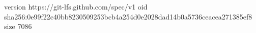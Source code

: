 version https://git-lfs.github.com/spec/v1
oid sha256:0e99f22c40bb8230509253bcb4a254d0e2028dad14b0a5736ceacea271385ef8
size 7086
